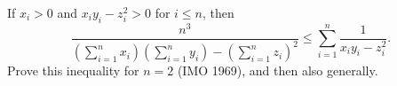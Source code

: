 If $x_i > 0$ and $x_iy_i - z_i^2 > 0$ for $i \leq n$, then
\[ \frac{n^3}{\left(\sum_{i=1}^n x_i\right)\left(\sum_{i=1}^n y_i\right) - \left(\sum_{i=1}^n z_i\right)^2} \leq \sum_{i=1}^n \frac{1}{x_iy_i - z_i^2}. \]
Prove this inequality for $n = 2$ (IMO 1969), and then also generally.
